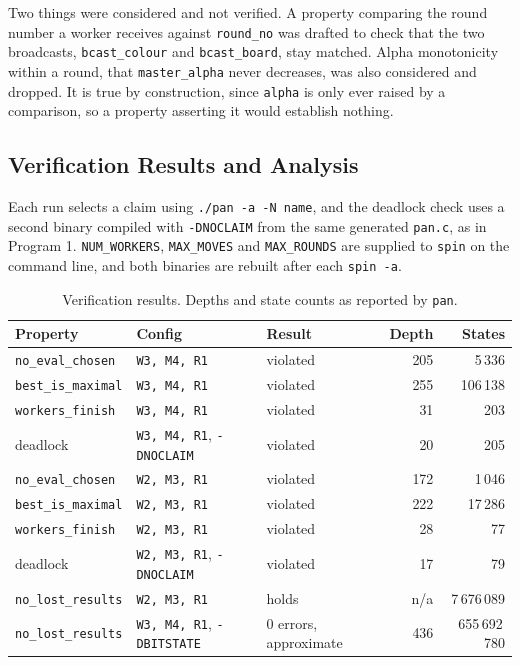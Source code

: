 \documentclass[10pt,a4paper]{article}
\newcommand{\code}[1]{\texttt{#1}}
\begin{document}
\medskip\noindent
Two things were considered and not verified. A property comparing the
round number a worker receives against \code{round\_no} was drafted to
check that the two broadcasts, \code{bcast\_colour} and \code{bcast\_board},
stay matched. Alpha monotonicity within a round, that \code{master\_alpha} never decreases,
was also considered and dropped. It is true by construction, since
\code{alpha} is only ever raised by a comparison, so a property asserting it
would establish nothing.

\subsection{Verification Results and Analysis}
\label{sec:results-2}

Each run selects a claim using \code{./pan -a -N name}, and the deadlock check
uses a second binary compiled with \code{-DNOCLAIM} from the same generated
\code{pan.c}, as in Program 1. \code{NUM\_WORKERS}, \code{MAX\_MOVES} and
\code{MAX\_ROUNDS} are supplied to \code{spin} on the command line, and both
binaries are rebuilt after each \code{spin -a}.

\begin{table}[htbp]
\centering
\caption{Verification results. Depths and state counts as
reported by \code{pan}.}
\label{tab:results2}
\begin{tabular}{l l l r r}
\toprule
\textbf{Property} & \textbf{Config} & \textbf{Result} & \textbf{Depth} & \textbf{States} \\
\midrule
\code{no\_eval\_chosen} & \code{W3, M4, R1} & violated & 205 & 5\,336 \\
\code{best\_is\_maximal} & \code{W3, M4, R1} & violated & 255 & 106\,138 \\
\code{workers\_finish} & \code{W3, M4, R1} & violated & 31 & 203 \\
deadlock & \code{W3, M4, R1}, \code{-DNOCLAIM} & violated & 20 & 205 \\
\code{no\_eval\_chosen} & \code{W2, M3, R1} & violated & 172 & 1\,046 \\
\code{best\_is\_maximal} & \code{W2, M3, R1} & violated & 222 & 17\,286 \\
\code{workers\_finish} & \code{W2, M3, R1} & violated & 28 & 77 \\
deadlock & \code{W2, M3, R1}, \code{-DNOCLAIM} & violated & 17 & 79 \\
\code{no\_lost\_results} & \code{W2, M3, R1} & holds & n/a & 7\,676\,089 \\
\code{no\_lost\_results} & \code{W3, M4, R1}, \code{-DBITSTATE} & 0 errors, approximate & 436 & 655\,692\,780 \\
\bottomrule
\end{tabular}
\end{table}
\end{document}
